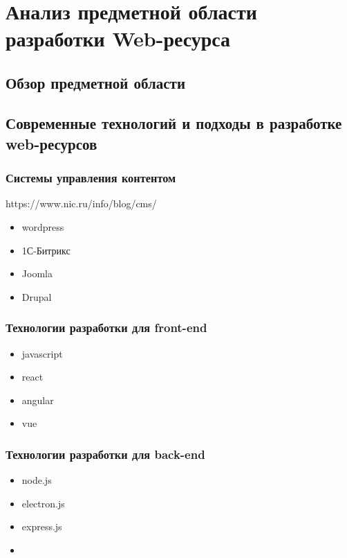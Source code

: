 %
\section{Анализ предметной области разработки Web-ресурса}
\subsection{Обзор предметной области}

\subsection{Современные технологий и подходы в разработке web-ресурсов}
    \subsubsection{Системы управления контентом}
        https://www.nic.ru/info/blog/cms/
        \begin{itemize}
            \item wordpress
            \item 1С-Битрикс
            \item Joomla
            \item Drupal
        \end{itemize}

    \subsubsection{Технологии разработки для front-end}
        \begin{itemize}
            \item javascript
            \item react
            \item angular
            \item vue
        \end{itemize}

    \subsubsection{Технологии разработки для back-end}
        \begin{itemize}
            \item node.js
            \item electron.js
            \item express.js
            \item 
        \end{itemize}

